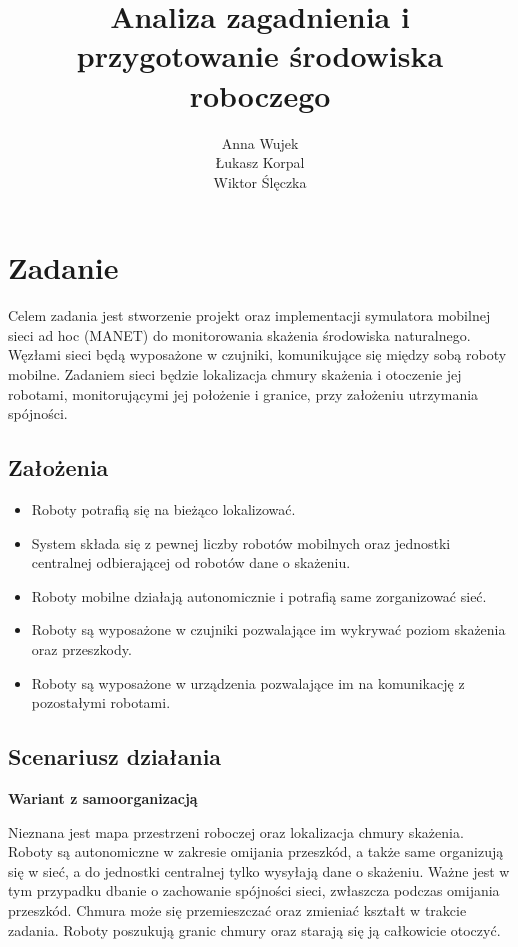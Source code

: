 \documentclass[a4paper, 12pt]{article}
\author{Anna Wujek \\ Łukasz Korpal \\ Wiktor Ślęczka}
\title{Analiza zagadnienia i przygotowanie środowiska roboczego}
\begin{document}
	\sloppy
	\maketitle
	\section{Zadanie}
	Celem zadania jest stworzenie projekt oraz implementacji symulatora mobilnej sieci ad hoc (MANET) do monitorowania skażenia środowiska naturalnego. Węzłami sieci będą wyposażone w czujniki, komunikujące się między sobą roboty mobilne. Zadaniem sieci będzie lokalizacja chmury skażenia i otoczenie jej robotami, monitorującymi jej położenie i granice, przy założeniu utrzymania spójności.
	
	\subsection{Założenia}
	\begin{itemize}
		\item Roboty potrafią się na bieżąco lokalizować.
		\item System składa się z pewnej liczby robotów mobilnych oraz jednostki centralnej odbierającej od robotów dane o skażeniu.
		\item Roboty mobilne działają autonomicznie i potrafią same zorganizować sieć.
		\item Roboty są wyposażone w czujniki pozwalające im wykrywać poziom skażenia oraz przeszkody.
		\item Roboty są wyposażone w urządzenia pozwalające im na komunikację z pozostałymi robotami.
	\end{itemize}
	
	\subsection{Scenariusz działania}

		\textbf{Wariant z samoorganizacją}
		
		Nieznana jest mapa przestrzeni roboczej oraz lokalizacja chmury skażenia. Roboty są autonomiczne w zakresie omijania przeszkód, a także same organizują się w sieć, a do jednostki centralnej tylko wysyłają dane o skażeniu. Ważne jest w tym przypadku dbanie o zachowanie spójności sieci, zwłaszcza podczas omijania przeszkód. Chmura może się przemieszczać oraz zmieniać kształt w trakcie zadania. Roboty poszukują granic chmury oraz starają się ją całkowicie otoczyć.
		
\end{document}

